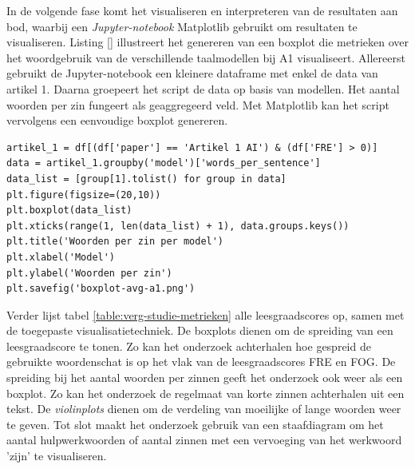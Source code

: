 In de volgende fase komt het visualiseren en interpreteren van de resultaten aan bod, waarbij een \textit{Jupyter-notebook} Matplotlib gebruikt om resultaten te visualiseren. Listing \ref{} illustreert het genereren van een boxplot die metrieken over het woordgebruik van de verschillende taalmodellen bij A1 visualiseert. Allereerst gebruikt de Jupyter-notebook een kleinere dataframe met enkel de data van artikel 1. Daarna groepeert het script de data op basis van modellen. Het aantal woorden per zin fungeert als geaggregeerd veld. Met Matplotlib kan het script vervolgens een eenvoudige boxplot genereren.

\begin{lstlisting}
artikel_1 = df[(df['paper'] == 'Artikel 1 AI') & (df['FRE'] > 0)]
data = artikel_1.groupby('model')['words_per_sentence']
data_list = [group[1].tolist() for group in data]
plt.figure(figsize=(20,10))
plt.boxplot(data_list)
plt.xticks(range(1, len(data_list) + 1), data.groups.keys())
plt.title('Woorden per zin per model')
plt.xlabel('Model')
plt.ylabel('Woorden per zin')
plt.savefig('boxplot-avg-a1.png')
\end{lstlisting}

Verder lijst tabel \ref{table:verg-studie-metrieken} alle leesgraadscores op, samen met de toegepaste visualisatietechniek. De boxplots dienen om de spreiding van een leesgraadscore te tonen. Zo kan het onderzoek achterhalen hoe gespreid de gebruikte woordenschat is op het vlak van de leesgraadscores FRE en FOG. De spreiding bij het aantal woorden per zinnen geeft het onderzoek ook weer als een boxplot. Zo kan het onderzoek de regelmaat van korte zinnen achterhalen uit een tekst. De \textit{violinplots} dienen om de verdeling van moeilijke of lange woorden weer te geven. Tot slot maakt het onderzoek gebruik van een staafdiagram om het aantal hulpwerkwoorden of aantal zinnen met een vervoeging van het werkwoord 'zijn' te visualiseren.

